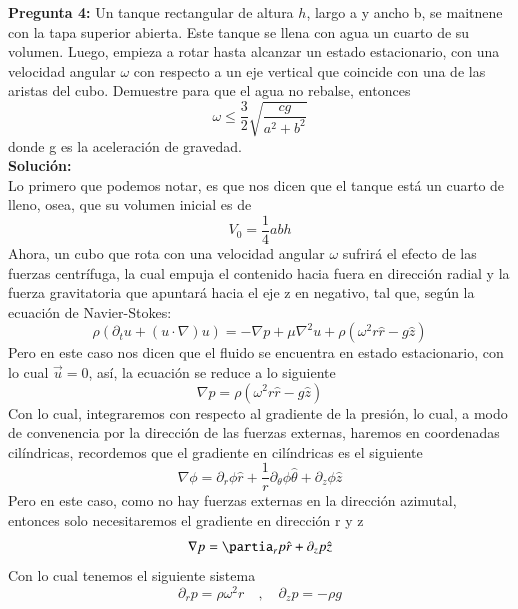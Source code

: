 \documentclass[11pt,letterpaper]{article}
\begin{document}
\textbf{Pregunta 4:} Un tanque rectangular de altura $h$, largo a y ancho b, se maitnene con la tapa superior abierta. Este tanque se llena con agua un cuarto de su volumen. Luego, empieza a rotar hasta alcanzar un estado estacionario, con una velocidad angular $\omega$ con respecto a un eje vertical que coincide con una de las aristas del cubo. Demuestre para que el agua no rebalse, entonces
\begin{equation}
  \omega \leq \frac{3}{2}\sqrt{\frac{cg}{a^2+b^2}}
\end{equation} 
donde g es la aceleración de gravedad.\\
\textbf{Solución:} \\
Lo primero que podemos notar, es que nos dicen que el tanque está un cuarto de lleno, osea, que su volumen inicial es de 
\begin{equation}
  V_0=\frac{1}{4}abh
\end{equation}
Ahora, un cubo que rota con una velocidad angular $\omega$ sufrirá el efecto de las fuerzas centrífuga, la cual empuja el contenido hacia fuera en dirección radial y la fuerza gravitatoria que apuntará hacia el eje z en negativo, tal que, según la ecuación de Navier-Stokes:
\begin{equation}
  \rho\left(\partial_tu + (u\cdot\nabla)u\right) =-\nabla p + \mu\nabla^2u + \rho(\omega^2r\hat{r}-g\hat{z})
\end{equation}
Pero en este caso nos dicen que el fluido se encuentra en estado estacionario, con lo cual $\vec{u}=0$, así, la ecuación se reduce a lo siguiente
\begin{equation}
  \nabla p = \rho(\omega^2r\hat{r}-g\hat{z})
\end{equation}
Con lo cual, integraremos con respecto al gradiente de la presión, lo cual, a modo de convenencia por la dirección de las fuerzas externas, haremos en coordenadas cilíndricas, recordemos que el gradiente en cilíndricas es el siguiente
\begin{equation}
  \nabla \phi = \partial_r\phi\hat{r} +\frac{1}{r}\partial_\theta \phi\hat{\theta} + \partial_z\phi\hat{z} 
\end{equation}
Pero en este caso, como no hay fuerzas externas en la dirección azimutal, entonces solo necesitaremos el gradiente en dirección r y z
\begin{equation}
  \nabla p = \partia_rp\hat{r} + \partial_zp\hat{z}
\end{equation}
Con lo cual tenemos el siguiente sistema
\begin{equation}
  \partial_rp = \rho\omega^2r\quad , \quad \partial_zp=-\rho g
\end{equation}
\end{document}
